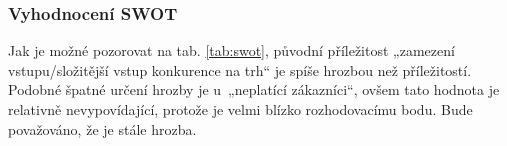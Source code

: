 \documentclass[a4paper, twoside, 11pt]{article}
\begin{document}
			\subsubsection{Vyhodnocení SWOT}
				Jak je možné pozorovat na tab. \ref{tab:swot}, původní příležitost „zamezení vstupu/složitější vstup konkurence na trh“ je spíše hrozbou než příležitostí. Podobné špatné určení hrozby je u~„neplatící zákazníci“, ovšem tato hodnota je relativně nevypovídající, protože je velmi blízko rozhodovacímu bodu. Bude považováno, že je stále hrozba.
		
		

\end{document}

